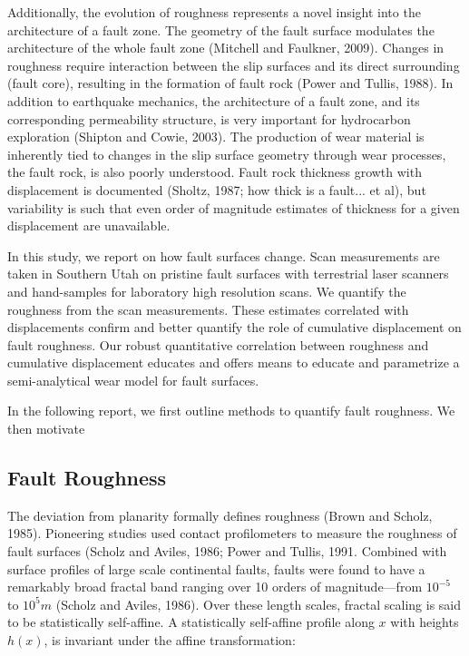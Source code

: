 \documentclass[12pt,a4paper]{article}
\begin{document}
Additionally, the evolution of roughness represents a novel insight into the architecture of a fault zone.  The geometry of the fault surface modulates the architecture of the whole fault zone (Mitchell and Faulkner, 2009). Changes in roughness require interaction between the slip surfaces and its direct surrounding (fault core), resulting in the formation of fault rock (Power and Tullis, 1988). In addition to earthquake mechanics, the architecture of a fault zone, and its corresponding permeability structure, is very important for hydrocarbon exploration (Shipton and Cowie, 2003). The production of wear material is inherently tied to changes in the slip surface geometry through wear processes, the fault rock, is also poorly understood. Fault rock thickness growth with displacement is documented (Sholtz, 1987; how thick is a fault... et al), but variability is such that even order of magnitude estimates of thickness for a given displacement are unavailable.

	In this study, we report on how fault surfaces change. Scan measurements are taken in Southern Utah on pristine fault  surfaces with terrestrial laser scanners and hand-samples for laboratory high resolution scans. We quantify the roughness from the scan measurements. These estimates correlated with displacements confirm and better quantify the role of cumulative displacement on fault roughness. Our robust quantitative correlation between roughness and cumulative displacement educates and offers means to educate and parametrize a semi-analytical wear model for fault surfaces.
	
	In the following report, we first outline methods to quantify fault roughness. We then motivate 


\subsection{Fault Roughness}

The deviation from planarity formally defines roughness (Brown and Scholz, 1985). Pioneering studies used contact profilometers to measure the roughness of fault surfaces (Scholz and Aviles, 1986; Power and Tullis, 1991. Combined with surface profiles of large scale continental faults, faults were found to have a remarkably broad fractal band ranging over 10 orders of magnitude—from $10^{-5}$ to $10^5 m$ (Scholz and Aviles, 1986). Over these length scales, fractal scaling is said to be statistically self-affine. 	
A statistically self-affine profile along $x$ with heights $h(x)$, is invariant under the affine transformation:
\end{document}
